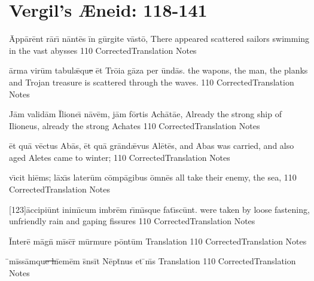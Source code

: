 \section{Vergil's {\AE}neid:  118-141} %

	\latline
	  {\=App\={\macron a}r\=ent r\={\macron a}r\={\macron \i} n\=ant\={\macron e}s \=in g\=urg\-it\-e v\=ast\={\macron o},}
	  { There appeared scattered sailors swimming in the vast abysses }
	  {110}
	  { CorrectedTranslation }
	  { Notes }



	\latline
	  {\=arm\-a v\-ir\=um t\-ab\-ul\={\ae}qu\sout{e }\=et Tr\={\macron o}\-i\-a g\=az\-a p\-er \=und\={\macron a}s.}
	  { the wapons, the man, the planks and Trojan treasure is scattered through the waves. }
	  {110}
	  { CorrectedTranslation }
	  { Notes }


	\latline
	  {J\=am v\-al\-id\=am \={\macron I}lione\={\macron \i} n\={\macron a}v\=em, j\=am f\=ort\-is \-Ach\={\macron a}t\={ae},}
	  { Already the strong ship of Ilioneus, already the strong Achates }
	  {110}
	  { CorrectedTranslation }
	  { Notes }



	\latline
	  {\=et qu\={\macron a} v\=ect\-us \-Ab\={\macron a}s, \=et qu\={\macron a} gr\=and\={\ae}v\-us \-Al\={\macron e}t\={\macron e}s,}
	  { and Abas was carried, and also aged Aletes came to winter;  }
	  {110}
	  { CorrectedTranslation }
	  { Notes }



	\latline
	  {v\={\macron \i}c\-it h\-i\=ems; l\=ax\={\macron \i}s l\-at\-er\=um c\=omp\={\macron a}g\-ib\-us \=omn\={\macron e}s}
	  { all  take their enemy, the sea, }
	  {110}
	  { CorrectedTranslation }
	  { Notes }


	\latline
	  {[123]\=acc\-ip\-i\=unt \-in\-im\={\macron \i}c\-um \-imbr\=em r\={\macron \i}m\={\macron \i}squ\-e f\-at\={\macron \i}sc\=unt.}
	  {  were taken by loose fastening, unfriendly rain and gaping fissures }
	  {110}
	  { CorrectedTranslation }
	  { Notes }


\latline
  {\=Int\-er\-e\={} m\=agn\={} m\=isc\={}r\={\macron {\i}} m\=urm\-ur\-e p\=ont\=um}
  { Translation }
  {110}
  { CorrectedTranslation }
  { Notes }



\latline
  {\={}m\=iss\=amqu\sout{e h}\={ie}m\=em s\={}ns\=it N\=ept\={}n\-us \-et \={\macron {\i}}m\={\macron {\i}}s}
  { Translation }
  {110}
  { CorrectedTranslation }
  { Notes }


